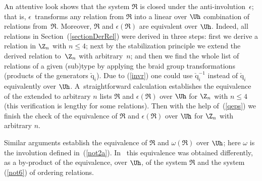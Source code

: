 \documentclass[11pt]{article}
\def\q{\check{\mathrm q}}\def\Q{\mathrm{Q}}\def\r#1{(\ref{#1})}\let\rf=\r
\numberwithin{equation}{section}
\begin{document}
\begin{remark}
An attentive look shows that the system $\mathfrak{R}$ is closed under the anti-involution~$\epsilon$; that is, $\epsilon$~transforms any
relation from $\mathfrak{R}$ into a linear over $\Uh$ combination of relations from~$\mathfrak{R}$. Moreover, $\mathfrak{R}$ and
$\epsilon (\mathfrak{R})$ are equivalent over $\Uh$. Indeed, all relations in Section~\rf{sectionDerRel} were derived in
three steps: f\/irst we derive a relation in $\Z_n$ with $n\leq 4$; next by the stabilization principle we extend the derived relation
to~$\Z_n$ with arbitrary~$n$;
and then we f\/ind the whole list of relations of a given (sub)type by applying the braid group transformations (products of the
generators $\q_i$). Due to \rf{invr} one could use $\q_i^{-1}$ instead of $\q_i$ equivalently over
$\Uh$. A~straightforward calculation establishes the equivalence of the extended to arbitrary $n$ lists $\mathfrak{R}$ and
$\epsilon (\mathfrak{R})$ over $\Uh$ for $\Z_n$ with
$n\leq 4$ (this verif\/ication is lengthy for some relations).
Then with the help of~\rf{qeps} we f\/inish the check of the equivalence of $\mathfrak{R}$ and $\epsilon (\mathfrak{R})$ over $\Uh$ for $\Z_n$ with
arbitrary $n$.


Similar arguments establish  the equivalence of $\mathfrak{R}$ and $\omega (\mathfrak{R})$ over $\Uh$; here $\omega$ is the involution def\/ined
in~\rf{not2a}. In~\cite{KO3} this equivalence was obtained dif\/ferently, as a by-product of the equivalence, over $\Uh$, of the system $\mathfrak{R}$ and
the system  \rf{not6} of ordering relations.
\end{remark}
\end{document}
